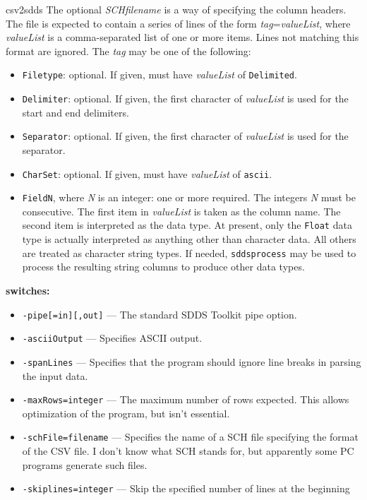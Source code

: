 \begin{sddsprog}{csv2sdds}
    The optional {\em SCHfilename} is a way of specifying the column headers. The file is
    expected to contain a series of lines of the form {\em tag}={\em valueList}, where {\em
    valueList} is a comma-separated list of one or more items. Lines not matching this format are
    ignored. The {\em tag} may be one of the following:
    \begin{itemize}
      \item \verb|Filetype|: optional. If given, must have {\em valueList} of \verb|Delimited|.
      \item \verb|Delimiter|: optional. If given, the first character of {\em valueList} is used for
        the start and end delimiters.
      \item \verb|Separator|: optional. If given, the first character of {\em valueList} is used for
        the separator.
      \item \verb|CharSet|: optional. If given, must have {\em valueList} of \verb|ascii|.
      \item \verb|FieldN|, where {\em N} is an integer: one or more required. The integers {\em N}
        must be consecutive. The first item in {\em valueList} is taken as the column name.
        The second item is interpreted as the data type. At present, only the \verb|Float| data type is actually
        interpreted as anything other than character data. All others are
        treated as character string types. If needed, \verb|sddsprocess| may be used to process the
        resulting string columns to produce other data types.
    \end{itemize}
  \item {\bf switches:}
    \begin{itemize}
      \item \verb|-pipe[=in][,out]| --- The standard SDDS Toolkit pipe option.
      \item \verb|-asciiOutput| --- Specifies ASCII output.
      \item \verb|-spanLines| --- Specifies that the program should ignore line breaks in parsing the
        input data.
      \item \verb|-maxRows=integer| --- The maximum number of rows expected. This allows
        optimization of the program, but isn't essential.
      \item \verb|-schFile=filename| --- Specifies the name of a SCH file specifying the
        format of the CSV file. I don't know what SCH stands for, but apparently some PC
        programs generate such files.
      \item \verb|-skiplines=integer| --- Skip the specified number of lines at the beginning

\end{itemize}
\end{sddsprog}
